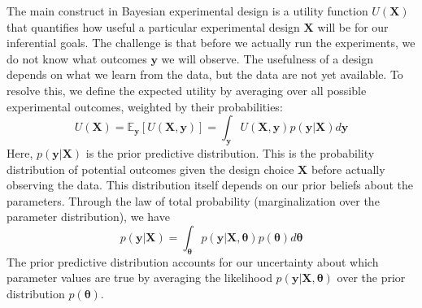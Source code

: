 The main construct in Bayesian experimental design is a utility function $U(\mathbf{X})$ that quantifies how useful a particular experimental design $\mathbf{X}$ will be for our inferential goals. The challenge is that before we actually run the experiments, we do not know what outcomes $\mathbf{y}$ we will observe. The usefulness of a design depends on what we learn from the data, but the data are not yet available. To resolve this, we define the expected utility by averaging over all possible experimental outcomes, weighted by their probabilities:
\begin{equation}
    U(\mathbf{X}) = \mathbb{E}_{\mathbf{y}}[U(\mathbf{X}, \mathbf{y})] = \int_{\mathbf{y}} U(\mathbf{X}, \mathbf{y}) p(\mathbf{y}|\mathbf{X}) d\mathbf{y}
\end{equation}
Here, $p(\mathbf{y}|\mathbf{X})$ is the prior predictive distribution. This is the probability distribution of potential outcomes given the design choice $\mathbf{X}$ before actually observing the data. This distribution itself depends on our prior beliefs about the parameters. Through the law of total probability (marginalization over the parameter distribution), we have
\begin{equation}
    p(\mathbf{y}|\mathbf{X}) = \int_{\boldsymbol{\theta}} p(\mathbf{y}|\mathbf{X}, \boldsymbol{\theta}) p(\boldsymbol{\theta}) d\boldsymbol{\theta}
\end{equation}
The prior predictive distribution accounts for our uncertainty about which parameter values are true by averaging the likelihood $p(\mathbf{y}|\mathbf{X}, \boldsymbol{\theta})$ over the prior distribution $p(\boldsymbol{\theta})$.

